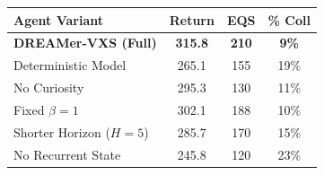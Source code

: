 \begin{table}
\centering


\begin{tabular}{@{}lccc@{}}
\toprule
\textbf{Agent Variant} & \textbf{Return} & \textbf{EQS} & \textbf{\% Coll} \\
\midrule
\textbf{DREAMer-VXS (Full)} & \textbf{315.8} & \textbf{210} & \textbf{9\%} \\
Deterministic Model & 265.1 & 155 & 19\% \\
No Curiosity & 295.3 & 130 & 11\% \\
Fixed \(\beta=1\) & 302.1 & 188 & 10\% \\
Shorter Horizon (\(H=5\)) & 285.7 & 170 & 15\% \\
No Recurrent State & 245.8 & 120 & 23\% \\
\bottomrule
\end{tabular}
\end{table}